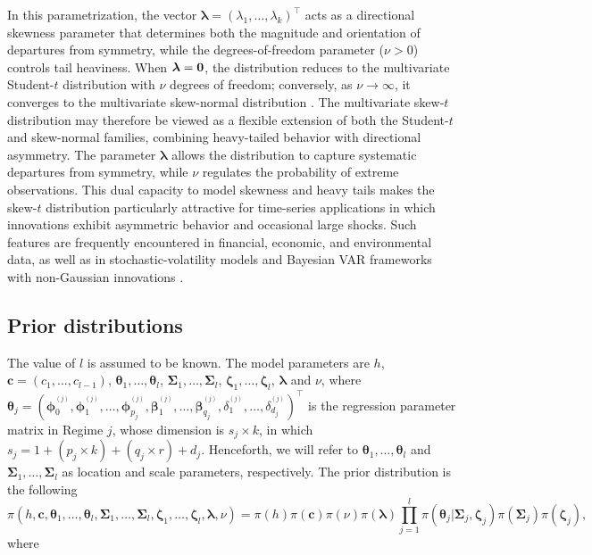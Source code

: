 In this parametrization, the vector $\bm{\lambda} = (\lambda_1,\ldots,\lambda_k)^{\top}$ acts as a directional skewness parameter that determines both the magnitude and orientation of departures from symmetry, while the degrees-of-freedom parameter ($\nu>0$) controls tail heaviness. When $\bm{\lambda}={\bf 0}$,
the distribution reduces to the multivariate Student-$t$ distribution with $\nu$ degrees of freedom; conversely, as $\nu\to\infty$, it converges to the multivariate skew-normal distribution \citep[page 133]{SDB03}. The multivariate skew-$t$ distribution may therefore be viewed as a flexible extension of both the Student-$t$ and skew-normal families, combining heavy-tailed behavior with directional asymmetry. The parameter $\bm{\lambda}$ allows the distribution to capture systematic departures from symmetry, while $\nu$ regulates the probability of extreme observations. This dual capacity to model skewness and heavy tails makes the skew-$t$ distribution particularly attractive for time-series applications in which innovations exhibit asymmetric behavior and occasional large shocks. Such features are frequently encountered in financial, economic, and environmental data, as well as in stochastic-volatility models and Bayesian VAR frameworks with non-Gaussian innovations \citep{AbantoValleLachosDey2015,KarlssonMazurNguyen2023}.

\subsection{Prior distributions}\label{pd}
The value of $l$ is assumed to be known. The model parameters are $h$, $\bm{c}=(c_1,\ldots,c_{l-1})$, $\bm{\theta}_1,\ldots,\bm{\theta}_l$, $\bm{\Sigma}_1,\ldots,\bm{\Sigma}_l$, $\bm{\zeta}_1,\ldots,\bm{\zeta}_l$, $\bm{\lambda}$ and $\nu$, where $\bm{\theta}_j=(\bm{\phi}_0^{^{(j)}},\bm{\phi}_1^{^{(j)}},\ldots,\bm{\phi}_{p_j}^{^{(j)}},\bm{\beta}_1^{^{(j)}},\ldots,\bm{\beta}_{q_j}^{^{(j)}},{\delta}_1^{^{(j)}},\ldots,{\delta}_{d_j}^{^{(j)}})^{\!\top}$ is the regression parameter matrix in Regime $j$, whose dimension is $s_j\times k$, in which $s_j=1 + (p_j\times k) + (q_j\times r) + d_j$. Henceforth, we will refer to $\bm{\theta}_1,\ldots,\bm{\theta}_l$ and $\bm{\Sigma}_1,\ldots,\bm{\Sigma}_l$ as location and scale parameters, respectively. The prior distribution is the following
$$\pi(h,\bm{c},\bm{\theta}_1,\ldots,\bm{\theta}_l,\bm{\Sigma}_1,\ldots,\bm{\Sigma}_l,\bm{\zeta}_1,\ldots,\bm{\zeta}_l,\bm{\lambda},\nu)=\pi(h)\pi(\bm{c})\pi(\nu)\pi(\bm{\lambda})\prod\limits_{j=1}^l
\pi(\bm{\theta}_j|\bm{\Sigma}_j,\bm{\zeta}_j)\pi(\bm{\Sigma}_j)\pi(\bm{\zeta}_j),$$
where 


